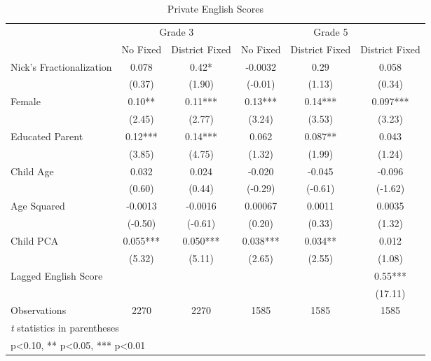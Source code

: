 \begin{table}[htbp]\centering
\def\sym#1{\ifmmode^{#1}\else\(^{#1}\)\fi}
\caption{Private English Scores}
\begin{tabular}{l*{5}{c}}
\toprule
                &\multicolumn{2}{c}{Grade 3}&\multicolumn{3}{c}{Grade 5}           \\\cmidrule(lr){2-3}\cmidrule(lr){4-6}
                &\multicolumn{1}{c}{No Fixed}&\multicolumn{1}{c}{District Fixed}&\multicolumn{1}{c}{No Fixed}&\multicolumn{1}{c}{District Fixed}&\multicolumn{1}{c}{District Fixed}\\
\midrule
Nick's Fractionalization&    0.078   &     0.42*  &  -0.0032   &     0.29   &    0.058   \\
                &   (0.37)   &   (1.90)   &  (-0.01)   &   (1.13)   &   (0.34)   \\
Female          &     0.10** &     0.11***&     0.13***&     0.14***&    0.097***\\
                &   (2.45)   &   (2.77)   &   (3.24)   &   (3.53)   &   (3.23)   \\
Educated Parent &     0.12***&     0.14***&    0.062   &    0.087** &    0.043   \\
                &   (3.85)   &   (4.75)   &   (1.32)   &   (1.99)   &   (1.24)   \\
Child Age       &    0.032   &    0.024   &   -0.020   &   -0.045   &   -0.096   \\
                &   (0.60)   &   (0.44)   &  (-0.29)   &  (-0.61)   &  (-1.62)   \\
Age Squared     &  -0.0013   &  -0.0016   &  0.00067   &   0.0011   &   0.0035   \\
                &  (-0.50)   &  (-0.61)   &   (0.20)   &   (0.33)   &   (1.32)   \\
Child PCA       &    0.055***&    0.050***&    0.038***&    0.034** &    0.012   \\
                &   (5.32)   &   (5.11)   &   (2.65)   &   (2.55)   &   (1.08)   \\
Lagged English Score&            &            &            &            &     0.55***\\
                &            &            &            &            &  (17.11)   \\
\midrule
Observations    &     2270   &     2270   &     1585   &     1585   &     1585   \\
\bottomrule
\multicolumn{6}{l}{\footnotesize \textit{t} statistics in parentheses}\\
\multicolumn{6}{l}{\footnotesize * p<0.10, ** p<0.05, *** p<0.01}\\
\end{tabular}
\end{table}
